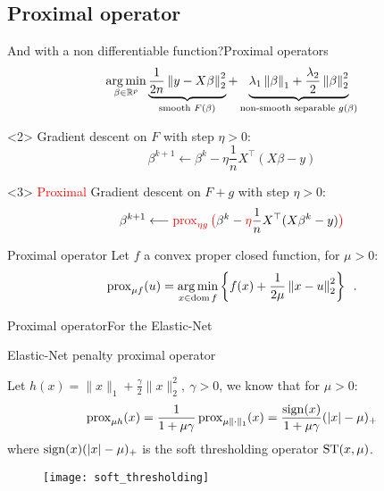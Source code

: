 \documentclass[10pt,aspectratio=43]{beamer}
\begin{document}
\subsection{Proximal operator}
\begin{frame}{And with a non differentiable function?}{Proximal operators}
\[\argmin_{\beta\in \bbR^p}
\LaTeXunderbrace{\frac{1}{2n}\norm{y-X\beta}_2^2}_{\text{smooth } F(\beta)} +
\LaTeXunderbrace{
    \lambda_1 \norm{\beta}_1 + \frac{\lambda_2}{2}\norm{\beta}_2^2}_{
\text{non-smooth separable } g(\beta)
}\]
\begin{onlyenv}<2>
Gradient descent on $F$ with step $\eta>0$:
\[\beta^{k+1} \longleftarrow \beta^k - \eta \frac{1}{n}X^\top(X\beta - y)\]
\end{onlyenv}

\begin{onlyenv}<3>
\textcolor{red}{Proximal} Gradient descent on $F+g$ with step $\eta>0$:
\[\beta^{k+1} \longleftarrow
\textcolor{red}{\operatorname{prox}_{\eta g}\big( }\beta^k -
 \textcolor{red}{\eta} \frac{1}{n}X^\top(X\beta^k - y)\textcolor{red}{\big)}\]

\begin{block}{Proximal operator}
Let $f$ a convex proper closed function, for $\mu>0$:
\begin{align*}
\operatorname{prox}_{\mu f}(u) = \mathop{\mathrm{arg\,min}}_{x\in\operatorname{dom} f}\left\{
    f(x) + \frac{1}{2\mu}\left \lVert x-u \right \rVert_2^2
\right\} \enspace.
\end{align*}
\end{block}
\end{onlyenv}

\end{frame}

\begin{frame}{Proximal operator}{For the Elastic-Net}
\begin{mybox}{Elastic-Net penalty proximal operator}

Let $h(x)=\|x\|_1 + \frac{\gamma}{2}\|x\|_2^2,\ \gamma>0$, we know \footnotemark
 that for $\mu>0$:
\[
\operatorname{prox}_{\mu h}(x) = \dfrac{1}{1 + \mu\gamma}\operatorname{prox}_{\mu \|\cdot\|_1}(x) =
\dfrac{\operatorname{sign}(x)}{1 + \mu\gamma}(|x| - \mu)_+
\]
where $\operatorname{sign}(x)(\left \vert x \right \vert - \mu)_+$ is the soft thresholding operator
$\operatorname{ST}(x,\mu)$.

\end{mybox}

\begin{figure}[h]
\centering
\texttt{[image: soft\_thresholding]}
\end{figure}
\end{frame}
\end{document}
